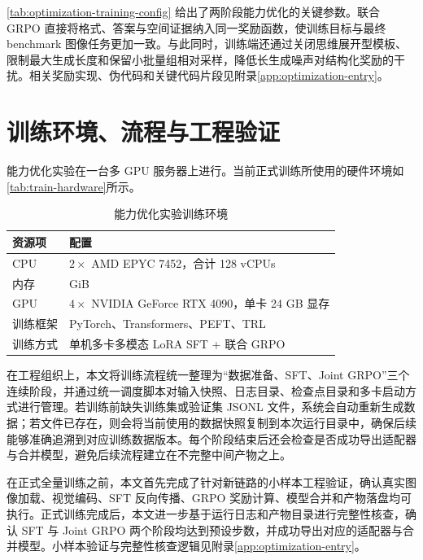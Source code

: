 \autoref{tab:optimization-training-config} 给出了两阶段能力优化的关键参数。联合 GRPO 直接将格式、答案与空间证据纳入同一奖励函数，使训练目标与最终 benchmark 图像任务更加一致。与此同时，训练端还通过关闭思维展开型模板、限制最大生成长度和保留小批量组相对采样，降低长生成噪声对结构化奖励的干扰。相关奖励实现、伪代码和关键代码片段见附录\autoref{app:optimization-entry}。

\section{训练环境、流程与工程验证}

能力优化实验在一台多 GPU 服务器上进行。当前正式训练所使用的硬件环境如\autoref{tab:train-hardware}所示。

\begin{table}[htbp]
    \centering
    \caption{能力优化实验训练环境}
    \label{tab:train-hardware}
    \small
    \begin{tabularx}{\textwidth}{@{}X>{\centering\arraybackslash}p{7.0cm}@{}}
        \toprule
        资源项 & 配置 \\
        \midrule
        CPU & \(2\times\) AMD EPYC 7452，合计 128 vCPUs \\
        内存 & 503 GiB \\
        GPU & \(4\times\) NVIDIA GeForce RTX 4090，单卡 24 GB 显存 \\
        训练框架 & PyTorch、Transformers、PEFT、TRL \\
        训练方式 & 单机多卡多模态 LoRA SFT + 联合 GRPO \\
        \bottomrule
    \end{tabularx}
\end{table}

在工程组织上，本文将训练流程统一整理为“数据准备、SFT、Joint GRPO”三个连续阶段，并通过统一调度脚本对输入快照、日志目录、检查点目录和多卡启动方式进行管理。若训练前缺失训练集或验证集 JSONL 文件，系统会自动重新生成数据；若文件已存在，则会将当前使用的数据快照复制到本次运行目录中，确保后续能够准确追溯到对应训练数据版本。每个阶段结束后还会检查是否成功导出适配器与合并模型，避免后续流程建立在不完整中间产物之上。

在正式全量训练之前，本文首先完成了针对新链路的小样本工程验证，确认真实图像加载、视觉编码、SFT 反向传播、GRPO 奖励计算、模型合并和产物落盘均可执行。正式训练完成后，本文进一步基于运行日志和产物目录进行完整性核查，确认 SFT 与 Joint GRPO 两个阶段均达到预设步数，并成功导出对应的适配器与合并模型。小样本验证与完整性核查逻辑见附录\autoref{app:optimization-entry}。

